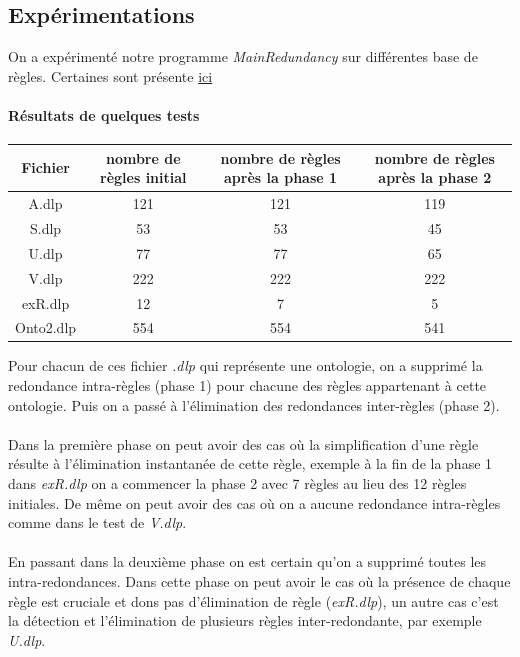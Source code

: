 \subsection{Expérimentations}

\par On a expérimenté notre programme \textit{MainRedundancy} sur différentes base de règles. 
Certaines sont présente \href{https://graphik-team.github.io/graal/experiments1}{ici} \\

\paragraph{Résultats de quelques tests}
\begin{center}
\begin{tabular}{|c||c|c|c|}
    \hline
    Fichier & nombre de règles initial & nombre de règles après la phase 1 & nombre de règles après la phase 2 \\
    \hline
     \hline
       A.dlp & 121 & 121 & 119    \\
     \hline
       S.dlp & 53  & 53 & 45      \\
     \hline
       U.dlp & 77  & 77 & 65      \\
     \hline
       V.dlp & 222 & 222 & 222    \\
     \hline
       exR.dlp & 12 & 7 & 5 	\\
     \hline
       Onto2.dlp & 554 & 554 & 541	\\
     \hline
\end{tabular}
\end{center}

\par Pour chacun de ces fichier \textit{.dlp} qui représente une ontologie, on a supprimé la redondance intra-règles (phase 1) pour chacune des règles appartenant à cette ontologie. Puis on a passé à l'élimination des redondances inter-règles (phase 2). \\ \\
Dans la première phase on peut avoir des cas où la simplification d'une règle résulte à l'élimination instantanée de cette règle, exemple à la fin de la phase 1 dans \textit{exR.dlp} on a commencer la phase 2 avec 7 règles au lieu des 12 règles initiales. De même on peut avoir des cas où on a aucune redondance intra-règles comme dans le test de \textit{V.dlp}.\\ \\
En passant dans la deuxième phase on est certain qu'on a supprimé toutes les intra-redondances. Dans cette phase on peut avoir le cas où la présence de chaque règle est cruciale et dons pas d'élimination de règle (\textit{exR.dlp}), un autre cas c'est la détection et l'élimination de plusieurs règles inter-redondante, par exemple \textit{U.dlp}.